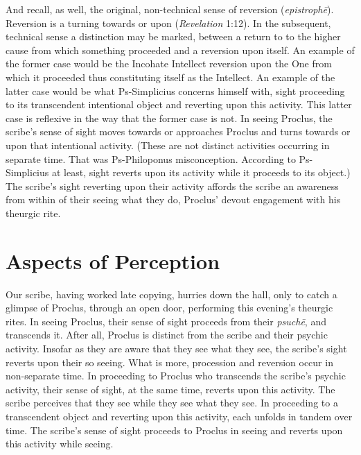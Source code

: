 And recall, as well, the original, non-technical sense of reversion (\emph{epistrophē}). Reversion is a turning towards or upon (\emph{Revelation} 1:12). In the subsequent, technical sense a distinction may be marked, between a return to to the higher cause from which something proceeded and a reversion upon itself. An example of the former case would be the Incohate Intellect reversion upon the One from which it proceeded thus constituting itself as the Intellect. An example of the latter case would be what Ps-Simplicius concerns himself with, sight proceeding to its transcendent intentional object and reverting upon this activity. This latter case is reflexive in the way that the former case is not. In seeing Proclus, the scribe's sense of sight moves towards or approaches Proclus and turns towards or upon that intentional activity. (These are not distinct activities occurring in separate time. That was Ps-Philoponus misconception. According to Ps-Simplicius at least, sight reverts upon its activity while it proceeds to its object.) The scribe's sight reverting upon their activity affords the scribe an awareness from within of their seeing what they do, Proclus' devout engagement with his theurgic rite.




\section{Aspects of Perception} %
\label{sec:procession_and_reversion_as_aspects_of_perception}

Our scribe, having worked late copying, hurries down the hall, only to catch a glimpse of Proclus, through an open door, performing this evening's theurgic rites. In seeing Proclus, their sense of sight proceeds from their \emph {psuchē}, and transcends it. After all, Proclus is distinct from the scribe and their psychic activity. Insofar as they are aware that they see what they see, the scribe's sight reverts upon their so seeing. What is more, procession and reversion occur in non-separate time. In proceeding to Proclus who transcends the scribe's psychic activity, their sense of sight, at the same time, reverts upon this activity. The scribe perceives that they see while they see what they see. In proceeding to a transcendent object and reverting upon this activity, each unfolds in tandem over time. The scribe's sense of sight proceeds to Proclus in seeing and reverts upon this activity while seeing. 

